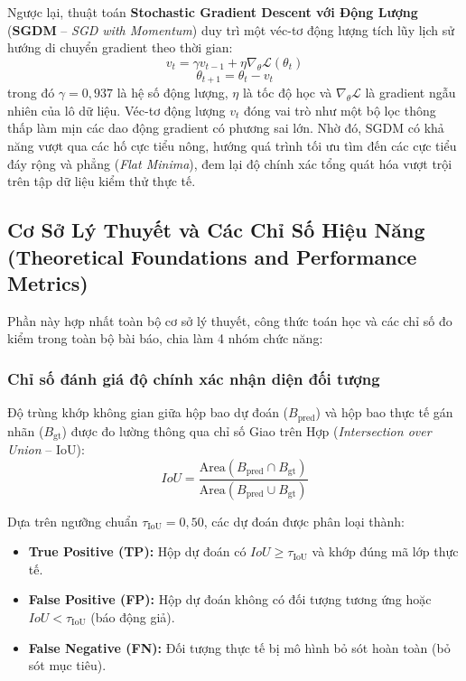 Ngược lại, thuật toán \textbf{Stochastic Gradient Descent với Động Lượng} (\textbf{SGDM} -- \textit{SGD with Momentum}) duy trì một véc-tơ động lượng tích lũy lịch sử hướng di chuyển gradient theo thời gian:
\begin{equation}
\label{eq:sgdm_velocity}
v_{t} = \gamma v_{t-1} + \eta \nabla_\theta \mathcal{L}(\theta_t)
\end{equation}
\begin{equation}
\label{eq:sgdm_update}
\theta_{t+1} = \theta_t - v_t
\end{equation}
trong đó $\gamma = 0,937$ là hệ số động lượng, $\eta$ là tốc độ học và $\nabla_\theta \mathcal{L}$ là gradient ngẫu nhiên của lô dữ liệu. Véc-tơ động lượng $v_t$ đóng vai trò như một bộ lọc thông thấp làm mịn các dao động gradient có phương sai lớn. Nhờ đó, SGDM có khả năng vượt qua các hố cực tiểu nông, hướng quá trình tối ưu tìm đến các cực tiểu đáy rộng và phẳng (\textit{Flat Minima}), đem lại độ chính xác tổng quát hóa vượt trội trên tập dữ liệu kiểm thử thực tế.

\subsection{Cơ Sở Lý Thuyết và Các Chỉ Số Hiệu Năng (Theoretical Foundations and Performance Metrics)}
\label{subsec:co_so_ly_thuyet_va_chi_so}

Phần này hợp nhất toàn bộ cơ sở lý thuyết, công thức toán học và các chỉ số đo kiểm trong toàn bộ bài báo, chia làm 4 nhóm chức năng:

\subsubsection{Chỉ số đánh giá độ chính xác nhận diện đối tượng}
Độ trùng khớp không gian giữa hộp bao dự đoán ($B_{\text{pred}}$) và hộp bao thực tế gán nhãn ($B_{\text{gt}}$) được đo lường thông qua chỉ số Giao trên Hợp (\textit{Intersection over Union} -- IoU):
\begin{equation}
\label{eq:iou_metric}
IoU = \frac{\text{Area}(B_{\text{pred}} \cap B_{\text{gt}})}{\text{Area}(B_{\text{pred}} \cup B_{\text{gt}})}
\end{equation}

Dựa trên ngưỡng chuẩn $\tau_{\text{IoU}} = 0,50$, các dự đoán được phân loại thành:
\begin{itemize}
    \item \textbf{True Positive (TP):} Hộp dự đoán có $IoU \ge \tau_{\text{IoU}}$ và khớp đúng mã lớp thực tế.
    \item \textbf{False Positive (FP):} Hộp dự đoán không có đối tượng tương ứng hoặc $IoU < \tau_{\text{IoU}}$ (báo động giả).
    \item \textbf{False Negative (FN):} Đối tượng thực tế bị mô hình bỏ sót hoàn toàn (bỏ sót mục tiêu).
\end{itemize}

